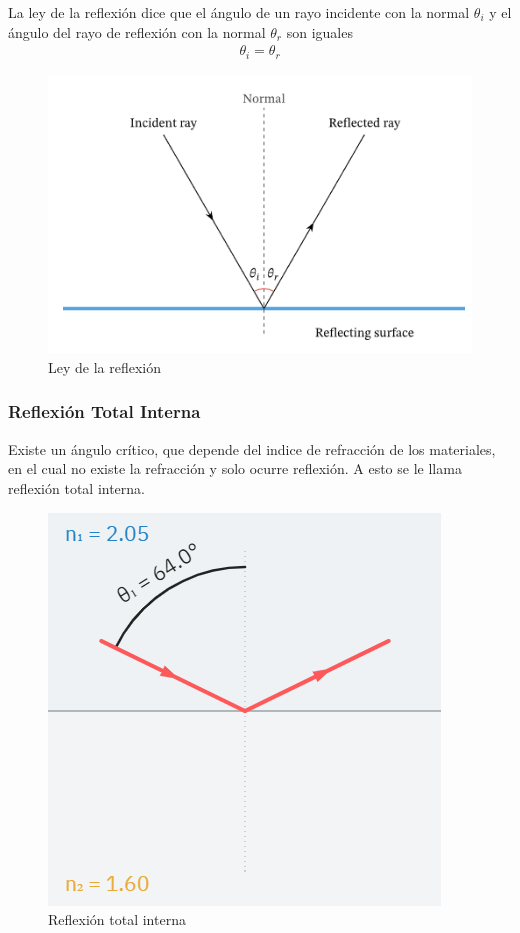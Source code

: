 \documentclass{article}
\begin{document}
La ley de la reflexión dice que el ángulo de un rayo incidente con la normal $\theta_i$ y el ángulo del rayo de reflexión con la normal $\theta_r$ son iguales
\begin{align*}
	\theta_i = \theta_r
\end{align*}
\begin{figure}[H]
	\centering
	\includegraphics[width=0.65\linewidth]{Figuras/Reflection}
	\caption{Ley de la reflexión}
	\label{fig:reflection}
\end{figure}

\pagebreak

\subsubsection{Reflexión Total Interna}

Existe un ángulo crítico, que depende del indice de refracción de los materiales, en el cual no existe la refracción y solo ocurre reflexión. A esto se le llama reflexión total interna.

\begin{figure}[H]
	\centering
	\includegraphics[width=0.50\linewidth]{Figuras/Total_Internal_Reflection}
	\caption{Reflexión total interna}
	\label{fig:totalinternalreflection}
\end{figure}
\end{document}
